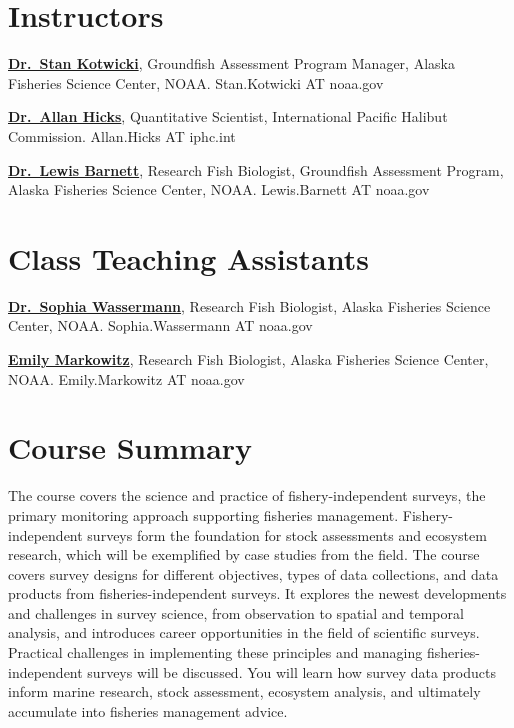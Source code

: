 \documentclass[
  letterpaper,
  oneside,
  open=any]{scrbook}
\begin{document}
\section{Instructors}\label{instructors}

\href{https://www.fisheries.noaa.gov/contact/stan-kotwicki}{\textbf{Dr.~Stan
Kotwicki}}, Groundfish Assessment Program Manager, Alaska Fisheries
Science Center, NOAA. Stan.Kotwicki AT noaa.gov

\href{https://www.iphc.int/staff/allan-hicks-ph-d/}{\textbf{Dr.~Allan
Hicks}}, Quantitative Scientist, International Pacific Halibut
Commission. Allan.Hicks AT iphc.int

\href{https://lewisbarnett.wordpress.com/}{\textbf{Dr.~Lewis Barnett}},
Research Fish Biologist, Groundfish Assessment Program, Alaska Fisheries
Science Center, NOAA. Lewis.Barnett AT noaa.gov

\section{Class Teaching Assistants}\label{class-teaching-assistants}

\href{https://sowasser.com/}{\textbf{Dr.~Sophia Wassermann}}, Research
Fish Biologist, Alaska Fisheries Science Center, NOAA. Sophia.Wassermann
AT noaa.gov

\href{https://www.fisheries.noaa.gov/contact/emily-markowitz}{\textbf{Emily
Markowitz}}, Research Fish Biologist, Alaska Fisheries Science Center,
NOAA. Emily.Markowitz AT noaa.gov

\section{Course Summary}\label{course-summary}

The course covers the science and practice of fishery-independent
surveys, the primary monitoring approach supporting fisheries
management. Fishery-independent surveys form the foundation for stock
assessments and ecosystem research, which will be exemplified by case
studies from the field. The course covers survey designs for different
objectives, types of data collections, and data products from
fisheries-independent surveys. It explores the newest developments and
challenges in survey science, from observation to spatial and temporal
analysis, and introduces career opportunities in the field of scientific
surveys. Practical challenges in implementing these principles and
managing fisheries-independent surveys will be discussed. You will learn
how survey data products inform marine research, stock assessment,
ecosystem analysis, and ultimately accumulate into fisheries management
advice.
\end{document}
